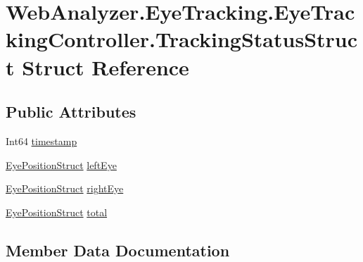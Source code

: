 \hypertarget{struct_web_analyzer_1_1_eye_tracking_1_1_eye_tracking_controller_1_1_tracking_status_struct}{}\section{Web\+Analyzer.\+Eye\+Tracking.\+Eye\+Tracking\+Controller.\+Tracking\+Status\+Struct Struct Reference}
\label{struct_web_analyzer_1_1_eye_tracking_1_1_eye_tracking_controller_1_1_tracking_status_struct}
\subsection*{Public Attributes}
\begin{DoxyCompactItemize}
\item 
Int64 \hyperlink{struct_web_analyzer_1_1_eye_tracking_1_1_eye_tracking_controller_1_1_tracking_status_struct_a1e112f7c265d222e532729f71e41ef9d}{timestamp}
\item 
\hyperlink{struct_web_analyzer_1_1_eye_tracking_1_1_eye_tracking_controller_1_1_eye_position_struct}{Eye\+Position\+Struct} \hyperlink{struct_web_analyzer_1_1_eye_tracking_1_1_eye_tracking_controller_1_1_tracking_status_struct_ab7fb433a90e9a4e804fa0c63d90f1723}{left\+Eye}
\item 
\hyperlink{struct_web_analyzer_1_1_eye_tracking_1_1_eye_tracking_controller_1_1_eye_position_struct}{Eye\+Position\+Struct} \hyperlink{struct_web_analyzer_1_1_eye_tracking_1_1_eye_tracking_controller_1_1_tracking_status_struct_a4f969b54ca8d3f0e0da1f4dd1c0fb731}{right\+Eye}
\item 
\hyperlink{struct_web_analyzer_1_1_eye_tracking_1_1_eye_tracking_controller_1_1_eye_position_struct}{Eye\+Position\+Struct} \hyperlink{struct_web_analyzer_1_1_eye_tracking_1_1_eye_tracking_controller_1_1_tracking_status_struct_a0856a70f2933dc67ed4971a443d6a971}{total}
\end{DoxyCompactItemize}


\subsection{Member Data Documentation}
\hypertarget{struct_web_analyzer_1_1_eye_tracking_1_1_eye_tracking_controller_1_1_tracking_status_struct_ab7fb433a90e9a4e804fa0c63d90f1723}{}

